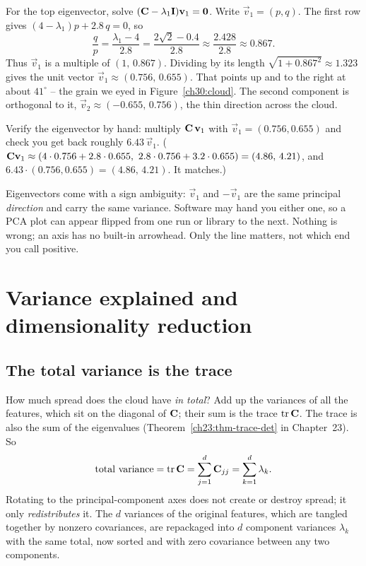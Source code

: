 For the top eigenvector, solve $(\mathbf{C}-\lambda_1\mathbf{I})\mathbf{v}_1=\mathbf{0}$. Write
$\vec v_1=(p,q)$. The first row gives $(4-\lambda_1)p+2.8\,q=0$, so
\[
  \frac{q}{p}=\frac{\lambda_1-4}{2.8}=\frac{2\sqrt2-0.4}{2.8}\approx\frac{2.428}{2.8}
  \approx0.867 .
\]
Thus $\vec v_1$ is a multiple of $(1,\,0.867)$. Dividing by its length
$\sqrt{1+0.867^2}\approx1.323$ gives the unit vector $\vec v_1\approx(0.756,\,0.655)$.
That points up and to the right at about $41^\circ$ -- the grain we eyed
in Figure~\ref{ch30:cloud}. The second component is orthogonal to it,
$\vec v_2\approx(-0.655,\,0.756)$, the thin direction across the cloud.

\begin{labbox}
Verify the eigenvector by hand: multiply $\mathbf{C}\,\mathbf{v}_1$ with
$\vec v_1=(0.756,0.655)$ and check you get back roughly $6.43\,\vec v_1$.
($\mathbf{C}\mathbf{v}_1\approx(4\cdot0.756+2.8\cdot0.655,\ 2.8\cdot0.756+3.2\cdot0.655)
=(4.86,\,4.21)$, and $6.43\cdot(0.756,0.655)=(4.86,\,4.21)$. It matches.)
\end{labbox}

\begin{trapbox}
Eigenvectors come with a sign ambiguity: $\vec v_1$ and $-\vec v_1$ are the same
principal \emph{direction} and carry the same variance. Software may hand you
either one, so a PCA plot can appear flipped from one run or library to the next.
Nothing is wrong; an axis has no built-in arrowhead. Only the line matters, not
which end you call positive.
\end{trapbox}

\section{Variance explained and dimensionality reduction}

\subsection{The total variance is the trace}

How much spread does the cloud have \emph{in total}? Add up the variances of all
the features, which sit on the diagonal of $\mathbf{C}$; their sum is the trace
$\operatorname{tr}\mathbf{C}$. The trace is also the sum of the eigenvalues (Theorem~\ref{ch23:thm-trace-det} in Chapter~23). So
\[
  \text{total variance}=\operatorname{tr}\mathbf{C}=\sum_{j=1}^d \mathbf{C}_{jj}=\sum_{k=1}^d\lambda_k .
\]
Rotating to the principal-component axes does not create or destroy spread; it
only \emph{redistributes} it. The $d$ variances of the original features, which are
tangled together by nonzero covariances, are repackaged into $d$ component variances
$\lambda_k$ with the same total, now sorted and with zero covariance between any two
components.

